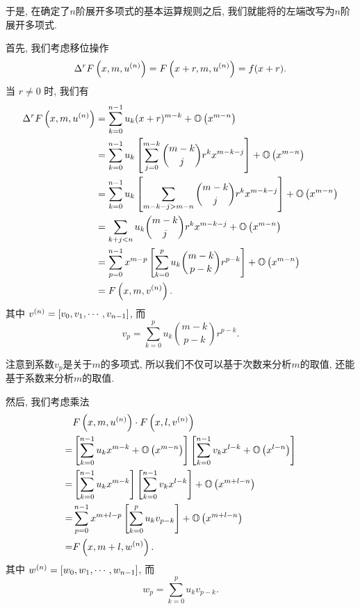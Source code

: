 于是, 在确定了$n$阶展开多项式的基本运算规则之后, 我们就能将的左端改写为$n$阶展开多项式.

首先, 我们考虑移位操作
\begin{equation}
\Delta^r F\left(x,m,u^{(n)}\right) = F\left(x+r,m,u^{(n)}\right) = f(x+r).
\end{equation}
当 $r\neq 0$ 时, 我们有 
\begin{equation}
\begin{split}
\Delta^r F\left(x,m,u^{(n)}\right) &= \sum_{k=0}^{n-1}{u_k (x+r)^{m-k}}+\mathbb O\left(x^{m-n}\right) \\
&= \sum_{k=0}^{n-1}{u_k \left[\sum_{j=0}^{m-k}{\binom{m-k}{j}r^kx^{m-k-j}}\right]}+\mathbb O\left(x^{m-n}\right) \\
&= \sum_{k=0}^{n-1}{u_k \left[\sum_{m-k-j>m-n}{\binom{m-k}{j}r^kx^{m-k-j}}\right]}+\mathbb O\left(x^{m-n}\right) \\
&= \sum_{k+j<n}{u_k {\binom{m-k}{j}r^kx^{m-k-j}}}+\mathbb O\left(x^{m-n}\right) \\
&=\sum_{p=0}^{n-1}{x^{m-p}\left[\sum_{k=0}^p{u_k\binom{m-k}{p-k}r^{p-k}}\right]}+\mathbb O\left(x^{m-n}\right)\\
&=F\left(x,m,v^{(n)}\right).
\end{split} \label{NEM-shift}
\end{equation}
其中 $v^{(n)}=\left[v_0,v_1,\cdots,v_{n-1}\right]$, 而
\begin{equation}
v_p=\sum_{k=0}^p{u_k\binom{m-k}{p-k}r^{p-k}}.
\end{equation}

注意到系数$v_p$是关于$m$的多项式, 所以我们不仅可以基于次数来分析$m$的取值, 还能基于系数来分析$m$的取值. 

然后, 我们考虑乘法 
\begin{equation}
\begin{split}
& F\left(x,m,u ^{(n)}\right)\cdot F\left(x,l,v^{(n)}\right) \\
=& \left[\sum_{k=0}^{n-1}{u_k x^{m-k}}+\mathbb O\left(x^{m-n}\right)\right]\left[\sum_{k=0}^{n-1}{v_k x^{l-k}}+\mathbb O\left(x^{l-n}\right)\right] \\
=& \left[\sum_{k=0}^{n-1}{u_k x^{m-k}}\right]\left[\sum_{k=0}^{n-1}{v_k x^{l-k}}\right]+\mathbb O\left(x^{m+l-n}\right) \\
=& \sum_{p=0}^{n-1}{x^{m+l-p}\left[\sum_{k=0}^p{u_k v_{p-k}}\right]}+\mathbb O\left(x^{m+l-n}\right) \\
=& F\left(x,m+l,w^{(n)}\right) .
\end{split} \label{NEM-times}
\end{equation}
其中 $w^{(n)}=\left[w_0,w_1,\cdots,w_{n-1}\right]$, 而
\begin{equation}
w_p=\sum_{k=0}^p{u_k v_{p-k}}.
\end{equation}

